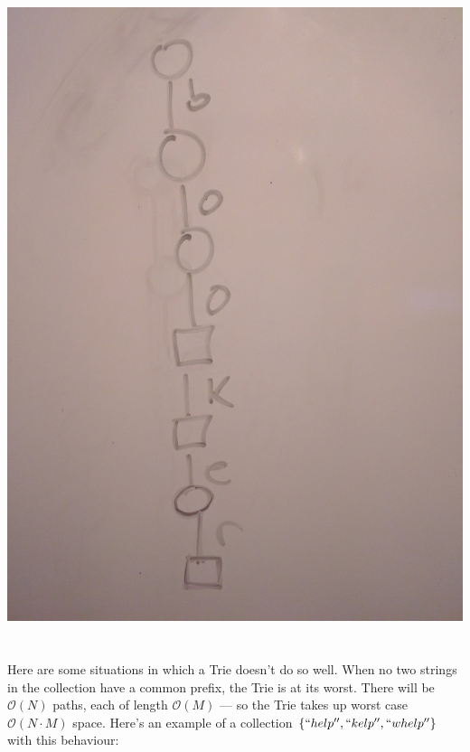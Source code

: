 \documentclass[a4paper,12pt]{article}
\begin{document}
~\\~\\
\includegraphics[scale=0.1]{fig_bestcase}
~\\~\\

\noindent
Here are some situations in which a Trie doesn't do so well. When no two strings in the collection have a common prefix, the Trie is at its worst. There will be $\mathcal{O}(N)$ paths, each of length $\mathcal{O}(M)$ --- so the Trie takes up worst case $\mathcal{O}(N \cdot M)$ space. Here's an example of a collection $\{ ``help'', ``kelp'', ``whelp'' \}$ with this behaviour:
\end{document}
